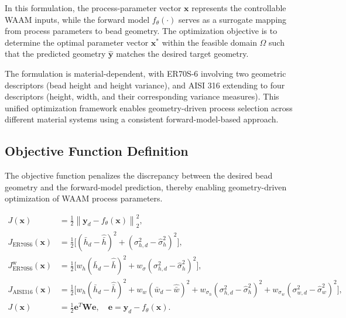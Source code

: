 \documentclass[11pt]{article}
\begin{document}
In this formulation, the process-parameter vector $\mathbf{x}$ represents the controllable WAAM inputs, while the forward model $f_{\theta}(\cdot)$ serves as a surrogate mapping from process parameters to bead geometry. The optimization objective is to determine the optimal parameter vector $\mathbf{x}^{*}$ within the feasible domain $\Omega$ such that the predicted geometry $\hat{\mathbf{y}}$ matches the desired target geometry.

The formulation is material-dependent, with ER70S-6 involving two geometric descriptors (bead height and height variance), and AISI 316 extending to four descriptors (height, width, and their corresponding variance measures). This unified optimization framework enables geometry-driven process selection across different material systems using a consistent forward-model-based approach.

\subsection{Objective Function Definition}

The objective function penalizes the discrepancy between the desired bead geometry and the forward-model prediction, thereby enabling geometry-driven optimization of WAAM process parameters.

\begin{tcolorbox}\label{Eq:55}
\begin{equation}
\begin{aligned}
J(\mathbf{x}) &= \frac{1}{2}
\left\|
\mathbf{y}_{d} - f_{\theta}(\mathbf{x})
\right\|_{2}^{2}, \\
J_{\mathrm{ER70S6}}(\mathbf{x}) &= \frac{1}{2}
\Big[
(\bar{h}_{d} - \hat{\bar{h}})^{2}
+
(\sigma_{h,d}^{2} - \hat{\sigma}_{h}^{2})^{2}
\Big], \\
J_{\mathrm{ER70S6}}^{\mathrm{w}}(\mathbf{x}) &= \frac{1}{2}
\Big[
w_{h}(\bar{h}_{d} - \hat{\bar{h}})^{2}
+
w_{\sigma}(\sigma_{h,d}^{2} - \hat{\sigma}_{h}^{2})^{2}
\Big], \\
J_{\mathrm{AISI316}}(\mathbf{x}) &= \frac{1}{2}
\Big[
w_{h}(\bar{h}_{d} - \hat{\bar{h}})^{2}
+
w_{w}(\bar{w}_{d} - \hat{\bar{w}})^{2}
+
w_{\sigma_h}(\sigma_{h,d}^{2} - \hat{\sigma}_{h}^{2})^{2}
+
w_{\sigma_w}(\sigma_{w,d}^{2} - \hat{\sigma}_{w}^{2})^{2}
\Big], \\
J(\mathbf{x}) &= \frac{1}{2}\mathbf{e}^{T}\mathbf{W}\mathbf{e}, \quad
\mathbf{e} = \mathbf{y}_{d} - f_{\theta}(\mathbf{x}).
\end{aligned}
\end{equation}
\end{tcolorbox}
\end{document}
